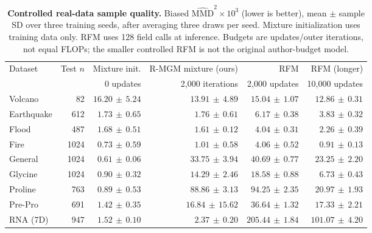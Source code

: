 \begin{table}[t]
\caption{\textbf{Controlled real-data sample quality.} Biased $\widehat{\mathrm{MMD}}^2\times10^3$ (lower is better), mean $\pm$ sample SD over three training seeds, after averaging three draws per seed. Mixture initialization uses training data only. RFM uses 128 field calls at inference. Budgets are updates/outer iterations, not equal FLOPs; the smaller controlled RFM is not the original author-budget model.}
\label{tab:main}
\centering\small
\begin{tabular}{@{}lrrrrr@{}}
\toprule
Dataset & Test $n$ & Mixture init. & R-MGM mixture (ours) & RFM & RFM (longer) \\
 & & 0 updates & 2,000 iterations & 2,000 updates & 10,000 updates \\
\midrule
Volcano & 82 & $16.20\,\pm\,5.24$ & $13.91\,\pm\,4.89$ & $15.04\,\pm\,1.07$ & $12.86\,\pm\,0.31$ \\
Earthquake & 612 & $1.73\,\pm\,0.65$ & $1.76\,\pm\,0.61$ & $6.17\,\pm\,0.38$ & $3.83\,\pm\,0.32$ \\
Flood & 487 & $1.68\,\pm\,0.51$ & $1.61\,\pm\,0.12$ & $4.04\,\pm\,0.31$ & $2.26\,\pm\,0.39$ \\
Fire & 1024 & $0.73\,\pm\,0.59$ & $1.01\,\pm\,0.58$ & $4.06\,\pm\,0.52$ & $0.91\,\pm\,0.13$ \\
General & 1024 & $0.61\,\pm\,0.06$ & $33.75\,\pm\,3.94$ & $40.69\,\pm\,0.77$ & $23.25\,\pm\,2.20$ \\
Glycine & 1024 & $0.90\,\pm\,0.32$ & $14.29\,\pm\,2.46$ & $18.58\,\pm\,0.88$ & $6.73\,\pm\,0.43$ \\
Proline & 763 & $0.89\,\pm\,0.53$ & $88.86\,\pm\,3.13$ & $94.25\,\pm\,2.35$ & $20.97\,\pm\,1.93$ \\
Pre-Pro & 691 & $1.42\,\pm\,0.35$ & $16.84\,\pm\,15.62$ & $36.64\,\pm\,1.32$ & $17.33\,\pm\,2.21$ \\
RNA (7D) & 947 & $1.52\,\pm\,0.10$ & $2.37\,\pm\,0.20$ & $205.44\,\pm\,1.84$ & $101.07\,\pm\,4.20$ \\
\bottomrule
\end{tabular}
\end{table}
